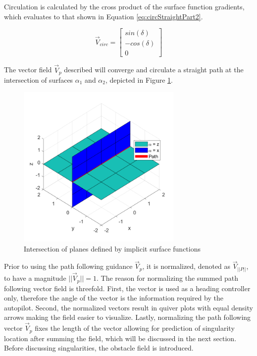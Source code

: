 \documentclass[numbered,pdftex]{ohio-etd}
\begin{document}
\noindent
Circulation is calculated by the cross product of the surface function gradients, which evaluates to that shown in Equation \ref{eq:circStraightPart2}.


\begin{equation}
\label{eq:circStraightPart2}
\overrightarrow{V}_{circ} = \begin{bmatrix}
sin(\delta) \\
-cos(\delta) \\
0
\end{bmatrix}
\end{equation}

The vector field $\overrightarrow{V}_p$ described will converge and circulate a straight path at the intersection of surfaces $\alpha_1$ and $\alpha_2$, depicted in Figure \ref{fig:planeIntersection}.

\begin{figure}[H]
	\centering
	\includegraphics[width=8cm]{Figures/planeIntersection}
	\caption{Intersection of planes defined by implicit surface functions}
	\label{fig:planeIntersection}
\end{figure}

Prior to using the path following guidance $\overrightarrow{V}_p$, it is normalized, denoted as $\overrightarrow{V}_{||P||}$, to have a magnitude $||\overrightarrow{V}_p|| = 1$. The reason for normalizing the summed path following vector field is threefold. First, the vector is used as a heading controller only, therefore the angle of the vector is the information required by the autopilot. Second, the normalized vectors result in quiver plots with equal density arrows making the field easier to visualize. Lastly, normalizing the path following vector $\overrightarrow{V}_p$ fixes the length of the vector allowing for prediction of singularity location after summing the field, which will be discussed in the next section. Before discussing singularities, the obstacle field is introduced. 
\end{document}

